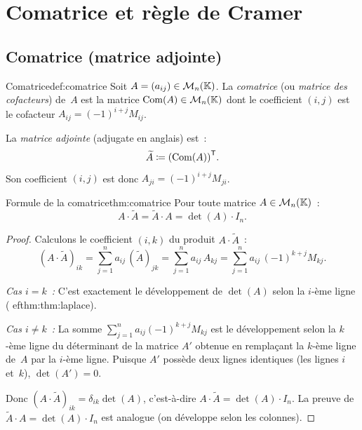 \section{Comatrice et règle de Cramer}\label{sec:comatrice-cramer}

\subsection{Comatrice (matrice adjointe)}\label{subsec:comatrice}

\begin{definition}{Comatrice}{def:comatrice}
  Soit $A=(a_{ij})\in\mathcal{M}_n({\mathbb{K}})$. La \emph{comatrice}
  (ou \emph{matrice des cofacteurs}) de~$A$
  est la matrice $\operatorname{Com}(A)\in\mathcal{M}_n({\mathbb{K}})$ dont le coefficient
  $(i,j)$ est le cofacteur $A_{ij}=(-1)^{i+j}M_{ij}$.

  La \emph{matrice adjointe}
  (adjugate en anglais) est~:
  \[
    \widetilde{A}\coloneqq{(\operatorname{Com}(A))}^{\mathsf{T}}.
  \]
  Son coefficient $(i,j)$ est donc $A_{ji}=(-1)^{i+j}M_{ji}$.
\end{definition}

\begin{theorem}{Formule de la comatrice}{thm:comatrice}
  Pour toute matrice $A\in\mathcal{M}_n({\mathbb{K}})$~:
  \[
    A\cdot\widetilde{A}=\widetilde{A}\cdot A=\det(A)\cdot I_n.
  \]
\end{theorem}

\begin{proof}
  Calculons le coefficient $(i,k)$ du produit $A\cdot\widetilde{A}$~:
  \[
    (A\cdot\widetilde{A})_{ik}=\sum_{j=1}^{n}a_{ij}\,(\widetilde{A})_{jk}
    =\sum_{j=1}^{n}a_{ij}\,A_{kj}
    =\sum_{j=1}^{n}a_{ij}\,(-1)^{k+j}M_{kj}.
  \]

  \emph{Cas $i=k$~:} C'est exactement le développement de $\det(A)$
  selon la $i$-ème ligne (
ef{thm:thm:laplace}).

  \emph{Cas $i\neq k$~:} La somme $\sum_{j=1}^n a_{ij}(-1)^{k+j}M_{kj}$
  est le développement selon la $k$-ème ligne du déterminant de la
  matrice $A'$ obtenue en remplaçant la $k$-ème ligne de~$A$ par la
  $i$-ème ligne. Puisque $A'$ possède deux lignes identiques (les lignes
  $i$ et~$k$), $\det(A')=0$.

  Donc $(A\cdot\widetilde{A})_{ik}=\delta_{ik}\det(A)$, c'est-à-dire
  $A\cdot\widetilde{A}=\det(A)\cdot I_n$. La preuve de
  $\widetilde{A}\cdot A=\det(A)\cdot I_n$ est analogue (on développe
  selon les colonnes).
\end{proof}

